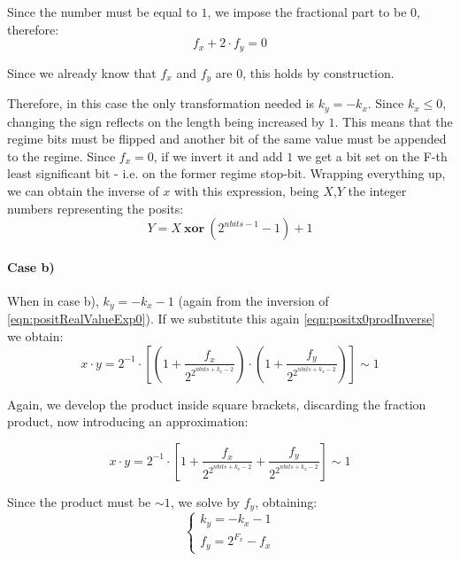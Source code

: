 Since the number must be equal to $1$, we impose the fractional part to be $0$, therefore:
\begin{equation}
    f_x + 2\cdot f_y = 0
\end{equation}

Since we already know that $f_x$ and $f_y$ are $0$, this holds by construction. 

Therefore, in this case the only transformation needed is $k_y = -k_x$. Since $k_x \leq 0$, changing the sign reflects on the length being increased by $1$. This means that the regime bits must be flipped and another bit of the same value must be appended to the regime. Since $f_x = 0$, if we invert it and add $1$ we get a bit set on the F-th least significant bit - i.e. on the former regime stop-bit. Wrapping everything up, we can obtain the inverse of $x$ with this expression, being $X$,$Y$ the integer numbers representing the posits:
\begin{equation}
    Y = X\ \mathbf{xor}\ (2^{nbits - 1} - 1) + 1
\end{equation}

\paragraph{Case b)} When in case b), $k_y = -k_x - 1$ (again from the inversion of \eqref{eqn:positRealValueExp0}). If we substitute this again \eqref{eqn:positx0prodInverse} we obtain:
\begin{equation}
    x \cdot y = 2^{-1} \cdot \left[ \left (1 + \frac{f_x}{2^{2^{nbits + k_x - 2}}} \right ) \cdot \left (1 + \frac{f_y}{2^{2^{nbits + k_x - 2}}} \right ) \right] \sim 1
\end{equation}

Again, we develop the product inside square brackets, discarding the fraction product, now introducing an approximation:

\begin{equation}
    x \cdot y = 2^{-1} \cdot \left[ 1 + \frac{f_x}{2^{2^{nbits + k_x - 2}}}  + \frac{f_y}{2^{2^{nbits + k_x - 2}}} \right] \sim 1
\end{equation}

Since the product must be $\sim 1$, we solve by $f_y$, obtaining:
\begin{equation}
\left\{\begin{matrix}
k_y = -k_x - 1 \\
f_y = 2^{F_x} - f_x
\end{matrix}\right.
\end{equation}

